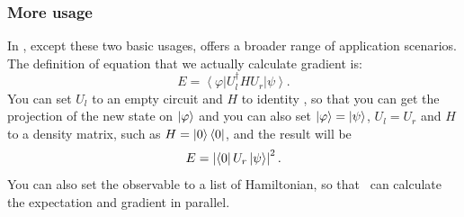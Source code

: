 \subsubsection{More usage}
In \MindQuantum, except these two basic usages, \getexpectationwithgrad offers a broader range of application scenarios. The definition of equation that we actually calculate gradient is:
\begin{equation}
  E = \left<\varphi\right|U_l^\dagger H U_r \left|\psi\right>.
\end{equation}
You can set $U_l$ to an empty circuit and $H$ to identity \QubitOperator, so that you can get the projection of the new state on $\ket{\varphi}$ and you can also set $\ket{\varphi}=\ket{\psi}$, $U_l = U_r$ and $H$ to a density matrix, such as $H = \ket{0}\bra{0}$, and the result will be
\begin{equation}
  E=\left|\bra{0}U_r\ket{\psi}\right|^2.
\end{equation}
You can also set the observable to a list of Hamiltonian, so that \MindQuantum\ can calculate the expectation and gradient in parallel.
